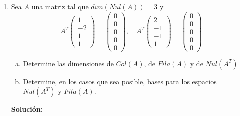 \documentclass[12pt]{article}
\newenvironment{solucion}
{\begin{mdframed}[backgroundcolor=black!10]
		{\bf Solución:}\\
	}
	{
	\end{mdframed}
}
\newenvironment{preguntas}
{\begin{enumerate}\itemsep12pt
	}
	{
	\end{enumerate}
}
\begin{document}
\begin{preguntas}
\begin{solucion}
\begin{enumerate}[a)]
			$$p_1(t) = (1,0,0)$$
			$$f(t) = (8,-15,10)$$
			$$g(t) = (4,-7,4)$$
			Armamos una matriz con ellos y pivoteamos,
			$$\begin{bmatrix}
			1 & 0 & 0 \\
			8 & -15 & 10 \\
			4 & -7 & 4
			\end{bmatrix}
			\sim
			\begin{bmatrix}
			1 & 0 & 0 \\
			0 & 1 & 0 \\
			0 & 0 & 1
			\end{bmatrix}$$
			Por lo que sus el conjunto $\{p_1(t), f(t), g(t)\}$ es $L.I.$
\end{enumerate}
\end{solucion}
\item Sea $A$ una matriz tal que $dim(Nul(A)) = 3$ y
	$$A^T \begin{pmatrix}
	1 \\ -2 \\ 1 \\ 1
	\end{pmatrix} = \begin{pmatrix}
	0 \\ 0 \\ 0 \\ 0 \\ 0
	\end{pmatrix}, \quad A^T \begin{pmatrix}
	2 \\ -1 \\ -1 \\ 1
	\end{pmatrix} = \begin{pmatrix}
	0 \\ 0 \\ 0 \\ 0 \\ 0
	\end{pmatrix}$$
\begin{enumerate}[a)]
\item Determine las dimensiones de $Col(A)$, de $Fila(A)$ y de $Nul(A^T)$
\item Determine, en los casos que sea posible, bases para los espacios $Nul(A^T)$ y $Fila(A)$.
\end{enumerate}
\begin{solucion}


\end{solucion}
\end{preguntas}
\end{document}
